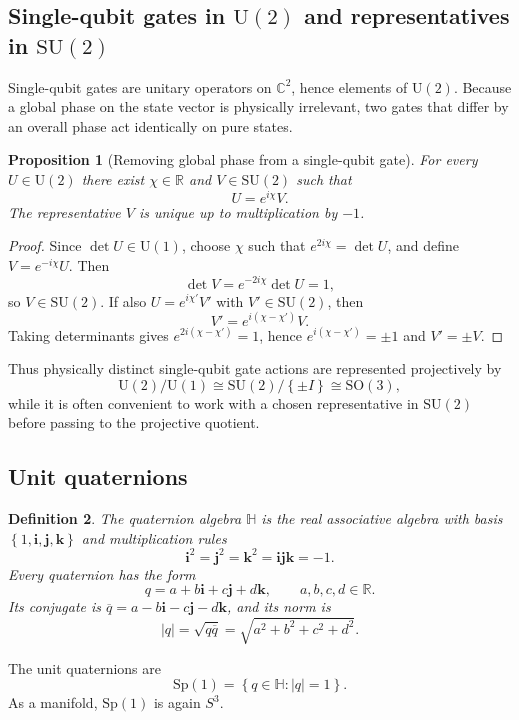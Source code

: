 \documentclass[11pt]{article}
\newtheorem{definition}{Definition}[section]
\newtheorem{proposition}[definition]{Proposition}
\theoremstyle{remark}
\newcommand{\R}{\mathbb{R}}
\newcommand{\C}{\mathbb{C}}
\newcommand{\HH}{\mathbb{H}}
\newcommand{\SU}{\mathrm{SU}}
\newcommand{\U}{\mathrm{U}}
\newcommand{\SO}{\mathrm{SO}}
\newcommand{\Sp}{\mathrm{Sp}}
\newcommand{\ii}{\mathbf{i}}
\newcommand{\jj}{\mathbf{j}}
\newcommand{\kk}{\mathbf{k}}
\newcommand{\Id}{I}
\newcommand{\abs}[1]{\left\lvert #1 \right\rvert}
\newcommand{\set}[1]{\left\{ #1 \right\}}
\begin{document}
\subsection{Single-qubit gates in \texorpdfstring{$\U(2)$}{U(2)} and representatives in \texorpdfstring{$\SU(2)$}{SU(2)}}

Single-qubit gates are unitary operators on $\C^2$, hence elements of $\U(2)$. Because a global phase on the state vector is physically irrelevant, two gates that differ by an overall phase act identically on pure states.

\begin{proposition}[Removing global phase from a single-qubit gate]
For every $U\in\U(2)$ there exist $\chi\in\R$ and $V\in\SU(2)$ such that
\[
U=e^{i\chi}V.
\]
The representative $V$ is unique up to multiplication by $-1$.
\end{proposition}

\begin{proof}
Since $\det U\in \U(1)$, choose $\chi$ such that $e^{2i\chi}=\det U$, and define $V=e^{-i\chi}U$. Then
\[
\det V=e^{-2i\chi}\det U=1,
\]
so $V\in\SU(2)$. If also $U=e^{i\chi'}V'$ with $V'\in\SU(2)$, then
\[
V' = e^{i(\chi-\chi')}V.
\]
Taking determinants gives $e^{2i(\chi-\chi')}=1$, hence $e^{i(\chi-\chi')}=\pm 1$ and $V'=\pm V$.
\end{proof}

Thus physically distinct single-qubit gate actions are represented projectively by
\[
\U(2)/\U(1)\cong \SU(2)/\set{\pm\Id}\cong \SO(3),
\]
while it is often convenient to work with a chosen representative in $\SU(2)$ before passing to the projective quotient.

\subsection{Unit quaternions}

\begin{definition}
The quaternion algebra $\HH$ is the real associative algebra with basis $\set{1,\ii,\jj,\kk}$ and multiplication rules
\[
\ii^2=\jj^2=\kk^2=\ii\jj\kk=-1.
\]
Every quaternion has the form
\[
q=a+b\ii+c\jj+d\kk,\qquad a,b,c,d\in\R.
\]
Its conjugate is $\overline{q}=a-b\ii-c\jj-d\kk$, and its norm is
\[
\abs{q}=\sqrt{q\overline{q}}=\sqrt{a^2+b^2+c^2+d^2}.
\]
\end{definition}

The unit quaternions are
\[
\Sp(1)=\set{q\in\HH:\abs{q}=1}.
\]
As a manifold, $\Sp(1)$ is again $S^3$.
\end{document}
